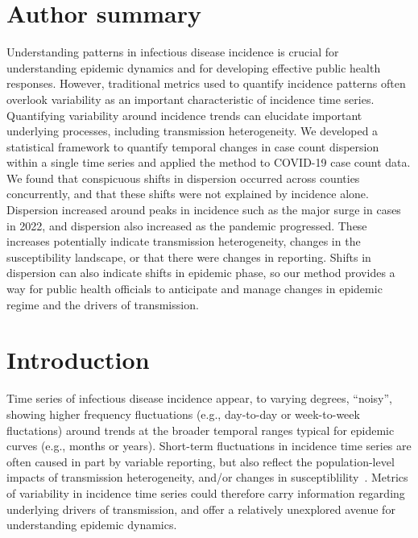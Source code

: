 \documentclass[10pt,letterpaper]{article}
\begin{document}
\section*{Author summary}
Understanding patterns in infectious disease incidence is crucial for understanding epidemic dynamics and for developing effective public health responses. 
However, traditional metrics used to quantify incidence patterns often overlook variability as an important characteristic of incidence time series. 
Quantifying variability around incidence trends can elucidate important underlying processes, including transmission heterogeneity.
We developed a statistical framework to quantify temporal changes in case count dispersion within a single time series and applied the method to COVID-19 case count data. We found that conspicuous shifts in dispersion occurred across counties concurrently, and that these shifts were not explained by incidence alone. 
Dispersion increased around peaks in incidence such as the major surge in cases in 2022, and dispersion also increased as the pandemic progressed. 
These increases potentially indicate transmission heterogeneity, changes in the susceptibility landscape, or that there were changes in reporting.
Shifts in dispersion can also indicate shifts in epidemic phase, so our method provides a way for public health officials to anticipate and manage changes in epidemic regime and the drivers of transmission. 

\linenumbers

\section*{Introduction}
Time series of infectious disease incidence appear, to varying degrees, ``noisy'', showing higher frequency fluctuations (e.g., day-to-day or week-to-week fluctations) around trends at the broader temporal ranges typical for epidemic curves (e.g., months or years).
Short-term fluctuations in incidence time series are often caused in part by variable reporting, but also reflect the population-level impacts of transmission heterogeneity, and/or changes in susceptiblility~\cite{lloyd-smith_superspreading_2005, kirkegaard_superspreading_2021, sun_transmission_2021,guo2023statistical,ko2023time}.
Metrics of variability in incidence time series could therefore carry information regarding underlying drivers of transmission, and offer a relatively unexplored avenue for understanding epidemic dynamics. 
\end{document}
